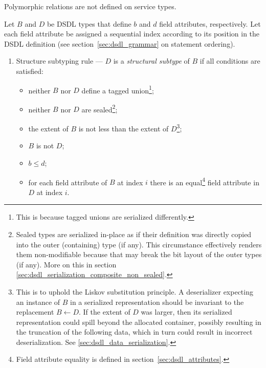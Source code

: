Polymorphic relations are not defined on service types.

Let $B$ and $D$ be DSDL types that define $b$ and $d$ field attributes, respectively.
Let each field attribute be assigned a sequential index according to its position in the DSDL definition
(see section~\ref{sec:dsdl_grammar} on statement ordering).

\begin{enumerate}
    \item Structure subtyping rule --- $D$ is a \emph{structural subtype} of $B$ if all conditions are satisfied:
    \begin{itemize}
        \item neither $B$ nor $D$ define a tagged union\footnote{%
            This is because tagged unions are serialized differently.
        };
        \item neither $B$ nor $D$ are sealed\footnote{%
            Sealed types are serialized in-place as if their definition was directly copied into the outer
            (containing) type (if any).
            This circumstance effectively renders them non-modifiable because that may break the bit layout
            of the outer types (if any).
            More on this in section \ref{sec:dsdl_serialization_composite_non_sealed}.
        };
        \item the extent of $B$ is not less than the extent of $D$\footnote{%
            This is to uphold the Liskov substitution principle.
            A deserializer expecting an instance of $B$ in a serialized representation should be invariant
            to the replacement $B \leftarrow{} D$.
            If the extent of $D$ was larger, then its serialized representation could spill beyond the allocated
            container, possibly resulting in the truncation of the following data, which in turn could result in
            incorrect deserialization.
            See \ref{sec:dsdl_data_serialization}.
        };
        \item $B$ is not $D$;
        \item $b \leq d$;
        \item for each field attribute of $B$ at index $i$ there is an equal\footnote{%
            Field attribute equality is defined in section~\ref{sec:dsdl_attributes}.
        } field attribute in $D$ at index $i$.
    \end{itemize}


\end{enumerate}

